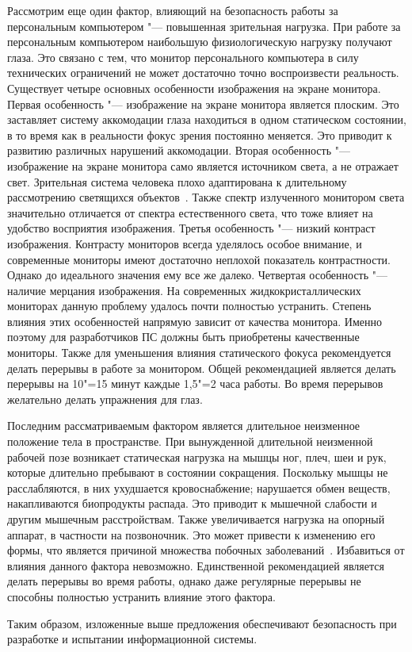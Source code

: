 Рассмотрим еще один фактор, влияющий на безопасность работы за персональным компьютером "--- повышенная зрительная нагрузка.
При работе за персональным компьютером наибольшую физиологическую нагрузку получают глаза.
Это связано с тем, что монитор персонального компьютера в силу технических ограничений не может достаточно точно воспроизвести реальность.
Существует четыре основных особенности изображения на экране монитора.
Первая особенность "--- изображение на экране монитора является плоским. Это заставляет систему аккомодации глаза находиться в одном статическом состоянии, в то время как в реальности фокус зрения постоянно меняется. Это приводит к развитию различных нарушений аккомодации.
Вторая особенность "--- изображение на экране монитора само является источником света, а не отражает свет. Зрительная система человека плохо адаптирована к длительному рассмотрению светящихся объектов~\cite{ot_long_work_pc}. Также спектр излученного монитором света значительно отличается от спектра естественного света, что тоже влияет на удобство восприятия изображения.
Третья особенность "--- низкий контраст изображения. Контрасту мониторов всегда уделялось особое внимание, и современные мониторы имеют достаточно неплохой показатель контрастности. Однако до идеального значения ему все же далеко.
Четвертая особенность "--- наличие мерцания изображения. На современных жидкокристаллических мониторах данную проблему удалось почти полностью устранить.
Степень влияния этих особенностей напрямую зависит от качества монитора. Именно поэтому для разработчиков ПС должны быть приобретены качественные мониторы.
Также для уменьшения влияния статического фокуса рекомендуется делать перерывы в работе за монитором.
Общей рекомендацией является делать перерывы на 10"=15 минут каждые 1,5"=2 часа работы.
Во время перерывов желательно делать упражнения для глаз.

Последним рассматриваемым фактором является длительное неизменное положение тела в пространстве.
При вынужденной длительной неизменной рабочей позе возникает статическая нагрузка на мышцы ног, плеч, шеи и рук, которые длительно пребывают в состоянии сокращения.
Поскольку мышцы не расслабляются, в них ухудшается кровоснабжение; нарушается обмен веществ, накапливаются биопродукты распада.
Это приводит к мышечной слабости и другим мышечным расстройствам.
Также увеличивается нагрузка на опорный аппарат, в частности на позвоночник. Это может привести к изменению его формы, что является причиной множества побочных заболеваний~\cite{ot_back_diseases}.
Избавиться от влияния данного фактора невозможно.
Единственной рекомендацией является делать перерывы во время работы, однако даже регулярные перерывы не способны полностью устранить влияние этого фактора.

Таким образом, изложенные выше предложения обеспечивают безопасность при разработке и испытании информационной системы.
